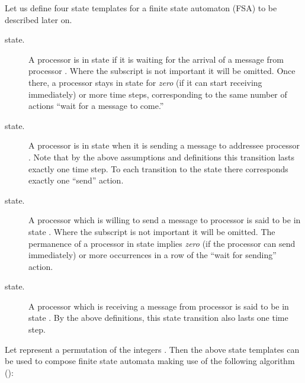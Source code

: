 \documentclass{elsart}
\begin{document}
\begin{defn}[states ]
Let us define four state templates for a finite state automaton 
(FSA) to be described later on.

\begin{description}
\item[ state.]
A processor is in state  if it is waiting for the arrival of a message
from processor . Where the subscript is not important it will be omitted.
Once there, a processor stays in state  for \emph{zero\/} (if it can start
receiving immediately) or more time steps, corresponding to the same number
of actions ``wait for a message to come.''


\item[ state.]
A processor is in state  when it is sending a message to addressee processor .
Note that by the above assumptions and definitions this transition lasts exactly one time step.
To each transition to the  state there corresponds exactly one ``send'' action.

\item[ state.]
A processor which is willing to send a message to processor  is said to be in
state . Where the subscript is not important it will be omitted.
The permanence of a processor in state  implies \emph{zero\/} (if
the processor can send immediately) or more occurrences in a row of
the ``wait for sending'' action.


\item[ state.]
A processor which is receiving a message from processor  is said to be in
state . By the above definitions, this state transition also lasts 
one time step.
\end{description}
\end{defn}

Let
 represent a permutation of the 
 integers . 
Then the above state templates can be used to compose 
finite state automata making use of the following
algorithm ():
\end{document}
